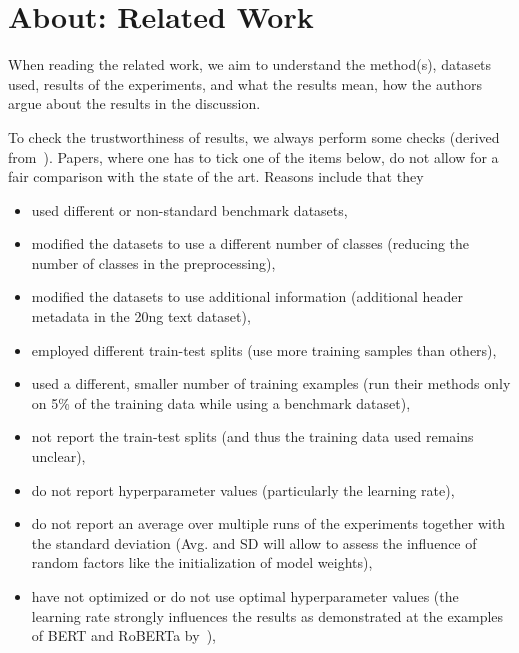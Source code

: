 \documentclass[manuscript, nonacm]{acmart}
\begin{document}
\section{About: Related Work}
\label{sec:relatedwork}

When reading the related work, we aim to understand the method(s), datasets used, results of the experiments, and what the results mean, \ie how the authors argue about the results in the discussion.

\begin{tcolorbox}[title=Instructions]
To check the trustworthiness of results, we always perform some checks (derived from~\cite{DBLP:journals/corr/abs-2204-03954v5-textclassification}).
%
Papers, where one has to tick one of the items below, do not allow for a fair comparison with the state of the art.
Reasons include that they 

\begin{itemize}
\item used different or non-standard benchmark datasets,

\item modified the datasets to use a different number of classes (\ie reducing the number of classes in the preprocessing),

\item modified the datasets to use additional information (\eg additional header metadata in the 20ng text dataset),

\item employed different train-test splits (\eg use more training samples than others), 

\item used a different, smaller number of training examples (\eg run their methods only on 5\% of the training data while using a benchmark dataset),

\item not report the train-test splits (and thus the training data used remains unclear),

\item do not report hyperparameter values (particularly the learning rate), 

\item do not report an average over multiple runs of the experiments together with the standard deviation (Avg. and SD will allow to assess the influence of random factors like the initialization of model weights),  

\item have not optimized or do not use optimal hyperparameter values (\eg the learning rate strongly influences the results as demonstrated at the examples of BERT and RoBERTa by~\citet{DBLP:journals/corr/abs-2204-03954v5-textclassification}), 


\end{itemize}
\end{tcolorbox}
\end{document}
